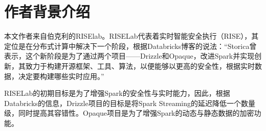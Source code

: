 \documentclass[UTF8,a4paper]{ctexart}
\begin{document}
\section{作者背景介绍}
本文作者来自伯克利的RISElab。RISELab代表着实时智能安全执行（RISE），其定位是在分布式计算中解决下一个阶段，根据Databricks博客的说法：“Storica曾表示，这个新阶段是为了通过两个项目——Drizzle和Opaque，改进Spark并实现创新，其致力于构建开源框架、工具、算法，以便能够以更高的安全性，根据实时数据，决定要构建哪些实时应用。”

RISELab的初期目标是为了增强Spark的安全性与实时能力，因此，根据Databricks的信息，Drizzle项目的目标是将Spark Streaming的延迟降低一个数量级，同时提高其容错性。Opaque项目是为了增强Spark的动态与静态数据的加密功能。

\clearpage
\end{document}
